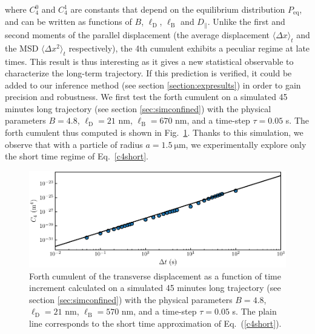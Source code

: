 {where $ C_4 ^0$ and $ C_4 ^1$ are constants that depend on the equilibrium distribution $P_\mathrm{eq}$, and can be written as functions of $B$, $\ell _ \mathrm{D}$, $\ell _\mathrm{B}$ and $D_\parallel$. Unlike the first and second moments of the parallel displacement (the average displacement $\langle \Delta x \rangle_t$ and the \gls{MSD} $\langle \Delta x ^2 \rangle_t $ respectively), the 4th cumulent exhibits a peculiar regime at late times. This result is thus interesting as it gives a new statistical observable to characterize the long-term trajectory. If this prediction is verified, it could be added to our inference method (see section \ref{section:expresults}) in order to gain precision and robustness. We first test the forth cumulent on a simulated 45 minutes long trajectory (see section \ref{sec:simconfined}) with the physical parameters $B=4.8$, $\ell_\mathrm{D} = 21$ nm, $\ell_\mathrm{B} = 670$ nm, and a time-step $\tau = 0.05$ s. The forth cumulent thus computed is shown in Fig.~\ref{fig.simc4}. Thanks to this simulation, we observe that with a particle of radius $a=1.5 ~\mathrm{\mu m}$, we experimentally explore only the short time regime of Eq.~\ref{c4short}.

\begin{figure}[H]
	\centering
	\includegraphics{02_body/chapter4/images/4th_cumulent/simulatedc4.pdf}
	\caption{Forth cumulent of the transverse displacement as a function of time increment calculated on a simulated 45 minutes long trajectory (see section \ref{sec:simconfined}) with the physical parameters $B=4.8$, $\ell_\mathrm{D} = 21$ nm, $\ell_\mathrm{B} = 570$ nm, and a time-step $\tau = 0.05$ s. The plain line corresponds to the short time approximation of Eq.~(\ref{c4short}).}
	\label{fig.simc4}
\end{figure}

}
